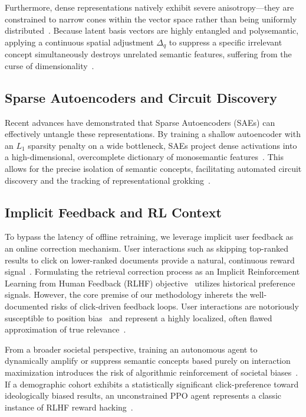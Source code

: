 Furthermore, dense representations natively exhibit severe anisotropy—they are constrained to narrow cones within the vector space rather than being uniformly distributed~\citep{ethayarajh2019}. Because latent basis vectors are highly entangled and polysemantic, applying a continuous spatial adjustment $\Delta_q$ to suppress a specific irrelevant concept simultaneously destroys unrelated semantic features, suffering from the curse of dimensionality~\citep{beyer1999}.

\subsection{Sparse Autoencoders and Circuit Discovery}
Recent advances have demonstrated that Sparse Autoencoders (SAEs) can effectively untangle these representations. By training a shallow autoencoder with an $L_1$ sparsity penalty on a wide bottleneck, SAEs project dense activations into a high-dimensional, overcomplete dictionary of monosemantic features~\citep{cunningham2024, bricken2023, templeton2024, gao2024scaling}. This allows for the precise isolation of semantic concepts, facilitating automated circuit discovery and the tracking of representational grokking~\citep{conmy2023, nanda2023, wang2023}. 

\subsection{Implicit Feedback and RL Context}
To bypass the latency of offline retraining, we leverage implicit user feedback as an online correction mechanism. User interactions such as skipping top-ranked results to click on lower-ranked documents provide a natural, continuous reward signal~\citep{joachims2002, afsar2022}. Formulating the retrieval correction process as an Implicit Reinforcement Learning from Human Feedback (RLHF) objective~\citep{christiano2017} utilizes historical preference signals. However, the core premise of our methodology inherets the well-documented risks of click-driven feedback loops. User interactions are notoriously susceptible to position bias~\citep{craswell2008} and represent a highly localized, often flawed approximation of true relevance~\citep{joachims2017}. 

From a broader societal perspective, training an autonomous agent to dynamically amplify or suppress semantic concepts based purely on interaction maximization introduces the risk of algorithmic reinforcement of societal biases~\citep{baeza-yates2018, noble2018}. If a demographic cohort exhibits a statistically significant click-preference toward ideologically biased results, an unconstrained PPO agent represents a classic instance of RLHF reward hacking~\citep{amodei2016, skalse2022, ouyang2022}.

